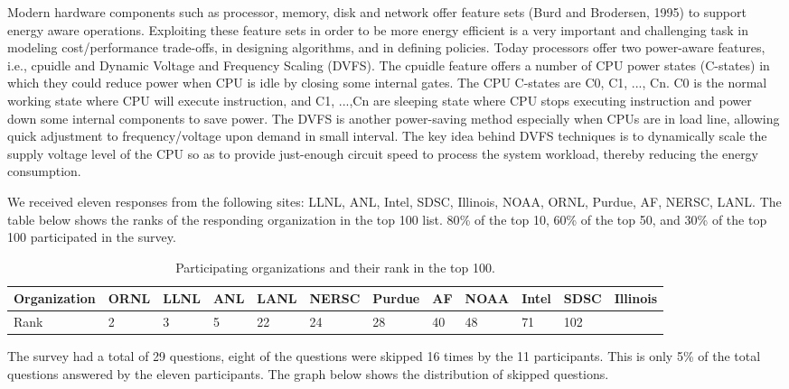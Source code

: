 \documentclass{llncs}
\begin{document}
Modern hardware components such as processor, memory, disk and network offer
feature sets (Burd and Brodersen, 1995) to support energy aware operations.
Exploiting these feature sets in order to be more energy efficient is a very
important and challenging task in modeling cost/performance trade-offs, in
designing algorithms, and in defining policies. Today processors offer two
power-aware features, i.e., cpuidle and Dynamic Voltage and Frequency
Scaling (DVFS). The cpuidle feature offers a number of CPU power states
(C-states) in which they could reduce power when CPU is idle by closing some
internal gates. The CPU C-states are C0, C1, ..., Cn. C0 is the normal
working state where CPU will execute instruction, and C1, ...,Cn are
sleeping state where CPU stops executing instruction and power down some
internal components to save power. The DVFS is another power-saving method
especially when CPUs are in load line, allowing quick adjustment to
frequency/voltage upon demand in small interval. The key idea behind DVFS
techniques is to dynamically scale the supply voltage level of the CPU so as
to provide just-enough circuit speed to process the system workload, thereby
reducing the energy consumption.

We received eleven responses from the following sites: LLNL, ANL, Intel,
SDSC, Illinois, NOAA, ORNL, Purdue, AF, NERSC, LANL. The table below shows
the ranks of the responding organization in the top 100 list. 80{\%} of the
top 10, 60{\%} of the top 50, and 30{\%} of the top 100 participated in the
survey.

\begin{table}[htbp]
\begin{center}
\caption{Participating organizations and their rank in the top 100.}
\begin{tabular}{|p{59pt}|l|l|l|l|l|l|l|l|l|l|l|}
\hline
Organization&
ORNL&
LLNL&
ANL&
LANL&
NERSC&
Purdue&
AF&
NOAA&
Intel&
SDSC&
Illinois \\
\hline
Rank&
2&
3&
5&
22&
24&
28&
40&
48&
71&
102&
 \\
\hline
\end{tabular}
\label{tab4}
\end{center}
\end{table}

The survey had a total of 29 questions, eight of the questions were skipped
16 times by the 11 participants. This is only 5{\%} of the total questions
answered by the eleven participants. The graph below shows the distribution
of skipped questions.
\end{document}
